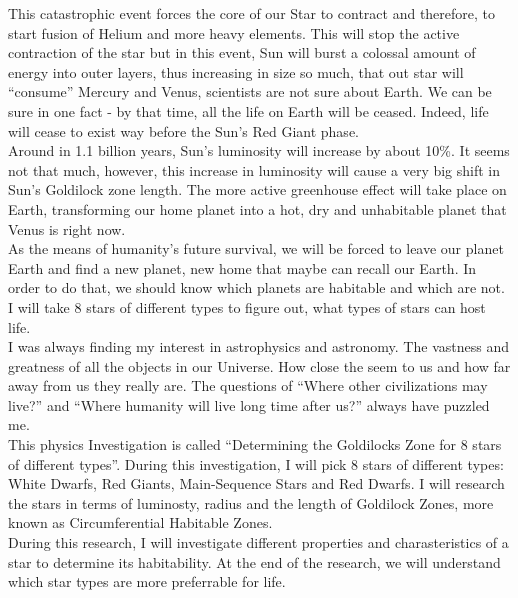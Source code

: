 \documentclass{article}
\begin{document}
This catastrophic event forces the core of our Star to contract and therefore, to start fusion of Helium and more heavy elements. This will stop the active contraction of the star but in this event, Sun will burst a colossal amount of energy into outer layers, thus increasing in size so much, that out star will ``consume'' Mercury and Venus, scientists are not sure about Earth. We can be sure in one fact -  by that time, all the life on Earth will be ceased. Indeed, life will cease to exist way before the Sun's Red Giant phase.\\

Around in 1.1 billion years, Sun's luminosity will increase by about 10\%. It seems not that much, however, this increase in luminosity will cause a very big shift in Sun's Goldilock zone length. The more active greenhouse effect will take place on Earth, transforming our home planet into a hot, dry and unhabitable planet that Venus is right now.~\cite{sun}\\

As the means of humanity's future survival, we will be forced to leave our planet Earth and find a new planet, new home that maybe can recall our Earth. In order to do that, we should know which planets are habitable and which are not. I will take 8 stars of different types to figure out, what types of stars can host life.\\

I was always finding my interest in astrophysics and astronomy. The vastness and greatness of all the objects in our Universe. How close the seem to us and how far away from us they really are. The questions of ``Where other civilizations may live?'' and ``Where humanity will live long time after us?'' always have puzzled me.\\

This physics Investigation is called ``Determining the Goldilocks Zone for 8 stars of different types''.
During this investigation, I will pick 8 stars of different types: White Dwarfs, Red Giants, Main-Sequence Stars and Red Dwarfs.
I will research the stars in terms of luminosty, radius and the length of Goldilock Zones, more known as Circumferential Habitable Zones.\\

During this research, I will investigate different properties and charasteristics of a star to determine its habitability.
At the end of the research, we will understand which star types are more preferrable for life.\\
\end{document}
